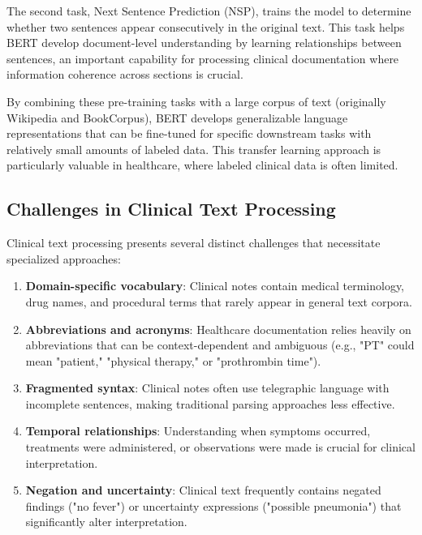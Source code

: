 \documentclass[3p,times,procedia]{elsarticle}
\begin{document}
The second task, Next Sentence Prediction (NSP), trains the model to determine whether two sentences appear consecutively in the original text. This task helps BERT develop document-level understanding by learning relationships between sentences, an important capability for processing clinical documentation where information coherence across sections is crucial.

By combining these pre-training tasks with a large corpus of text (originally Wikipedia and BookCorpus), BERT develops generalizable language representations that can be fine-tuned for specific downstream tasks with relatively small amounts of labeled data. This transfer learning approach is particularly valuable in healthcare, where labeled clinical data is often limited.

\subsection{Challenges in Clinical Text Processing}

Clinical text processing presents several distinct challenges that necessitate specialized approaches:

\begin{enumerate}
    \item \textbf{Domain-specific vocabulary}: Clinical notes contain medical terminology, drug names, and procedural terms that rarely appear in general text corpora.
    
    \item \textbf{Abbreviations and acronyms}: Healthcare documentation relies heavily on abbreviations that can be context-dependent and ambiguous (e.g., "PT" could mean "patient," "physical therapy," or "prothrombin time").
    
    \item \textbf{Fragmented syntax}: Clinical notes often use telegraphic language with incomplete sentences, making traditional parsing approaches less effective.
    
    \item \textbf{Temporal relationships}: Understanding when symptoms occurred, treatments were administered, or observations were made is crucial for clinical interpretation.
    
    \item \textbf{Negation and uncertainty}: Clinical text frequently contains negated findings ("no fever") or uncertainty expressions ("possible pneumonia") that significantly alter interpretation.
\end{enumerate}
\end{document}
